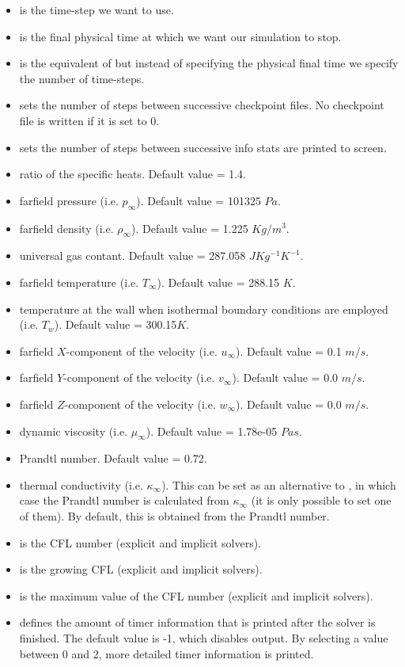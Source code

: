 \begin{itemize}
\item {} is the time-step we want to use.
\item {} is the final physical time at which we want our simulation to stop.
\item {} is the equivalent of  but instead of specifying the
physical final time we specify the number of time-steps.
\item {} sets the number of steps between successive checkpoint files.
No checkpoint file is written if it is set to 0.
\item {} sets the number of steps between successive info stats are printed
to screen.
\item {} ratio of the specific heats. Default value = 1.4.
\item {} farfield pressure (i.e. $p_{\infty}$). Default value = 101325 $Pa$.
\item {} farfield density (i.e. $\rho_{\infty}$). Default value = 1.225 $Kg/m^{3}$.
\item {} universal gas contant. Default value = 287.058 $JKg^{-1}K^{-1}$.
\item {} farfield temperature (i.e. $T_{\infty}$). Default value = 288.15 $K$.
\item {} temperature at the wall when isothermal boundary
conditions are employed (i.e. $T_{w}$). Default value = 300.15$K$.
\item {} farfield $X$-component of the velocity (i.e. $u_{\infty}$). Default value = 0.1 $m/s$.
\item {} farfield $Y$-component of the velocity (i.e. $v_{\infty}$). Default value = 0.0 $m/s$.
\item {} farfield $Z$-component of the velocity (i.e. $w_{\infty}$). Default value = 0.0 $m/s$.
\item {} dynamic viscosity (i.e. $\mu_{\infty}$). Default value = 1.78e-05 $Pa s$.
\item {} Prandtl number. Default value = 0.72.
\item {} thermal conductivity (i.e. $\kappa_{\infty}$). This can be set as an
 alternative to , in which case the Prandtl number is calculated from $\kappa_{\infty}$
 (it is only possible to set one of them). By default, this is obtained from the Prandtl number.
\item {} is the CFL number (explicit and implicit solvers).
\item {} is the growing CFL (explicit and implicit solvers).
\item {} is the maximum value of the CFL number (explicit and implicit solvers).
\item {} defines the amount of timer information that is printed after the solver is finished.
      The default value is -1, which disables output. By selecting a value between 0 and 2, more detailed timer
      information is printed.
\end{itemize}

